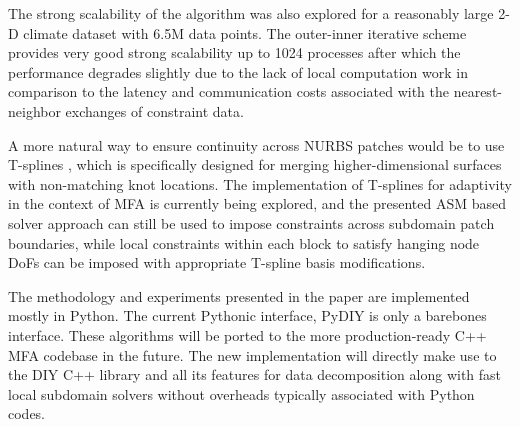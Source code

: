 \documentclass[conference]{IEEEtran}
\begin{document}
The strong scalability of the algorithm was also explored for a reasonably large 2-D climate dataset with 6.5M data points. The outer-inner iterative scheme provides very good strong scalability up to 1024 processes after which the performance degrades slightly due to the lack of local computation work in comparison to the latency and communication costs associated with the nearest-neighbor exchanges of constraint data. 

A more natural way to ensure continuity across NURBS patches would be to use T-splines \cite{sederberg-2004}, which is specifically designed for merging higher-dimensional surfaces with non-matching knot locations. The implementation of T-splines for adaptivity in the context of MFA is currently being explored, and the presented ASM based solver approach can still be used to impose constraints across subdomain patch boundaries, while local constraints within each block to satisfy hanging node DoFs can be imposed with appropriate T-spline basis modifications.

The methodology and experiments presented in the paper are implemented mostly in Python. The current Pythonic interface, PyDIY is only a barebones interface. These algorithms will be ported to the more production-ready C++ MFA codebase \cite{mfa-codebase} in the future. The new implementation will directly make use to the DIY C++ library and all its features for data decomposition along with fast local subdomain solvers without overheads typically associated with Python codes. 


\end{document}
